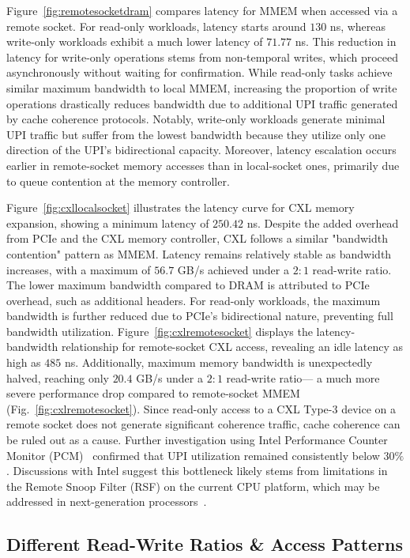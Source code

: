 Figure~\ref{fig:remotesocketdram} compares latency for MMEM when accessed via a remote socket. For read-only workloads, latency starts around $130$ ns, whereas write-only workloads exhibit a much lower latency of $71.77$ ns. This reduction in latency for write-only operations stems from non-temporal writes, which proceed asynchronously without waiting for confirmation. While read-only tasks achieve similar maximum bandwidth to local MMEM, increasing the proportion of write operations drastically reduces bandwidth due to additional UPI traffic generated by cache coherence protocols. Notably, write-only workloads generate minimal UPI traffic but suffer from the lowest bandwidth because they utilize only one direction of the UPI’s bidirectional capacity. Moreover, latency escalation occurs earlier in remote-socket memory accesses than in local-socket ones, primarily due to queue contention at the memory controller.

Figure~\ref{fig:cxllocalsocket} illustrates the latency curve for CXL memory expansion, showing a minimum latency of $250.42$ ns. Despite the added overhead from PCIe and the CXL memory controller, CXL follows a similar "bandwidth contention" pattern as MMEM. Latency remains relatively stable as bandwidth increases, with a maximum of $56.7$ GB/s achieved under a $2:1$ read-write ratio. The lower maximum bandwidth compared to DRAM is attributed to PCIe overhead, such as additional headers. For read-only workloads, the maximum bandwidth is further reduced due to PCIe’s bidirectional nature, preventing full bandwidth utilization. Figure~\ref{fig:cxlremotesocket} displays the latency-bandwidth relationship for remote-socket CXL access, revealing an idle latency as high as $485$ ns. Additionally, maximum memory bandwidth is unexpectedly halved, reaching only $20.4$ GB/s under a $2:1$ read-write ratio— a much more severe performance drop compared to remote-socket MMEM (Fig.~\ref{fig:cxlremotesocket}). Since read-only access to a CXL Type-3 device on a remote socket does not generate significant coherence traffic, cache coherence can be ruled out as a cause. Further investigation using Intel Performance Counter Monitor (PCM)~\cite{pcm} confirmed that UPI utilization remained consistently below $30\%$. Discussions with Intel suggest this bottleneck likely stems from limitations in the Remote Snoop Filter (RSF) on the current CPU platform, which may be addressed in next-generation processors~\cite{emerald_rapids}.

\subsection{Different Read-Write Ratios \& Access Patterns}

